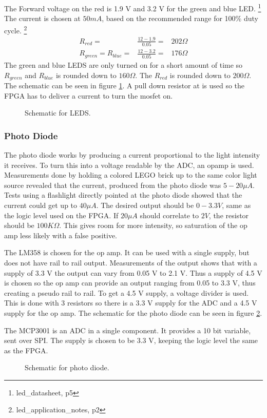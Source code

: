 The Forward voltage on the red is 1.9 V and 3.2 V for the green and blue LED.
\footnote{led\_datasheet, p5}
The current is chosen at $50 mA$, based on the recommended range for 100\% duty cycle.
\footnote{led\_application\_notes, p2}
\begin{eqnarray}
 R_{red} =& \frac{12-1.9}{0.05} =& 202 \Omega\\
 R_{green} = R_{blue} =& \frac{12-3.2}{0.05} =& 176 \Omega
\end{eqnarray}
The green and blue LEDS are only turned on for a short amount of time so $R_{green}$ and $R_{blue}$ is rounded down to $160 \Omega$.
The $R_{red}$ is rounded down to $200\Omega$.
The schematic can be seen in figure \ref{fig:sch_led}.
A pull down resistor at is used so the FPGA has to deliver a current to turn the mosfet on.

\begin{figure}[h]
\centering
  \caption{Schematic for LEDS.}
  \label{fig:sch_led}
\end{figure}

\subsubsection{Photo Diode}
The photo diode works by producing a current proportional to the light intensity it receives.
To turn this into a voltage readable by the ADC, an opamp is used.
Measurements done by holding a colored LEGO brick up to the same color light source revealed that the current, produced from the photo diode was $5-20 \mu A$.
Tests using a flashlight directly pointed at the photo diode showed that the current could get up to $40 \mu A$.
The desired output should be $0-3.3 V$, same as the logic level used on the FPGA.
If $20 \mu A$ should correlate to $2 V$, the resistor should be $100K\Omega$. 
This gives room for more intensity, so saturation of the op amp less likely with a false positive.

The LM358 is chosen for the op amp.
It can be used with a single supply, but does not have rail to rail output.
Measurements of the output shows that with a supply of 3.3 V the output can vary from 0.05 V to 2.1 V.
Thus a supply of 4.5 V is chosen so the op amp can provide an output ranging from 0.05 to 3.3 V, thus creating a pseudo rail to rail.
To get a 4.5 V supply, a voltage divider is used. This is done with 3 resistors so there is a 3.3 V supply for the ADC and a 4.5 V supply for the op amp.
The schematic for the photo diode can be seen in figure \ref{fig:sch_photo_diode}.

The MCP3001 is an ADC in a single component.
It provides a 10 bit variable, sent over SPI.
The supply is chosen to be 3.3 V, keeping the logic level the same as the FPGA.

\begin{figure}[h]
\centering
  \caption{Schematic for photo diode.}
  \label{fig:sch_photo_diode}
\end{figure}

